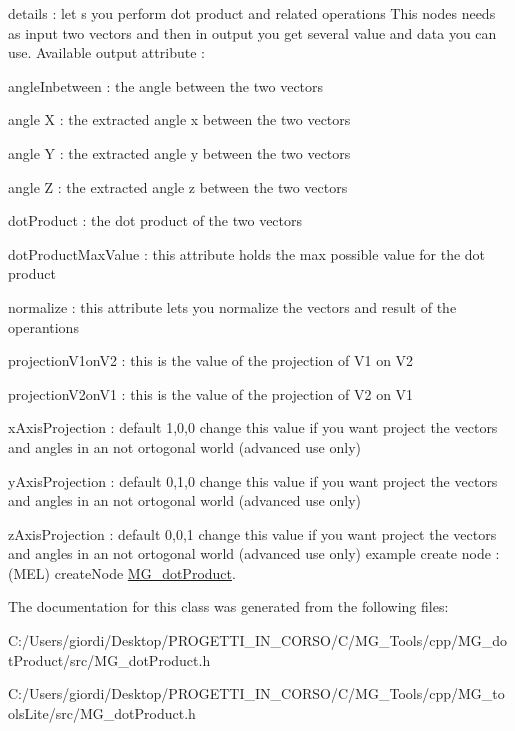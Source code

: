 details \-: let s you perform dot product and related operations This nodes needs as input two vectors and then in output you get several value and data you can use. Available output attribute \-:
\begin{DoxyItemize}
\item angle\-Inbetween \-: the angle between the two vectors
\item angle X \-: the extracted angle x between the two vectors
\item angle Y \-: the extracted angle y between the two vectors
\item angle Z \-: the extracted angle z between the two vectors
\item dot\-Product \-: the dot product of the two vectors
\item dot\-Product\-Max\-Value \-: this attribute holds the max possible value for the dot product
\item normalize \-: this attribute lets you normalize the vectors and result of the operantions
\item projection\-V1on\-V2 \-: this is the value of the projection of V1 on V2
\item projection\-V2on\-V1 \-: this is the value of the projection of V2 on V1
\item x\-Axis\-Projection \-: default 1,0,0 change this value if you want project the vectors and angles in an not ortogonal world (advanced use only)
\item y\-Axis\-Projection \-: default 0,1,0 change this value if you want project the vectors and angles in an not ortogonal world (advanced use only)
\item z\-Axis\-Projection \-: default 0,0,1 change this value if you want project the vectors and angles in an not ortogonal world (advanced use only) example create node \-: (M\-E\-L) create\-Node \hyperlink{class_m_g__dot_product}{M\-G\-\_\-dot\-Product}. 
\end{DoxyItemize}

The documentation for this class was generated from the following files\-:\begin{DoxyCompactItemize}
\item 
C\-:/\-Users/giordi/\-Desktop/\-P\-R\-O\-G\-E\-T\-T\-I\-\_\-\-I\-N\-\_\-\-C\-O\-R\-S\-O/\-C/\-M\-G\-\_\-\-Tools/cpp/\-M\-G\-\_\-dot\-Product/src/M\-G\-\_\-dot\-Product.\-h\item 
C\-:/\-Users/giordi/\-Desktop/\-P\-R\-O\-G\-E\-T\-T\-I\-\_\-\-I\-N\-\_\-\-C\-O\-R\-S\-O/\-C/\-M\-G\-\_\-\-Tools/cpp/\-M\-G\-\_\-tools\-Lite/src/M\-G\-\_\-dot\-Product.\-h\end{DoxyCompactItemize}
